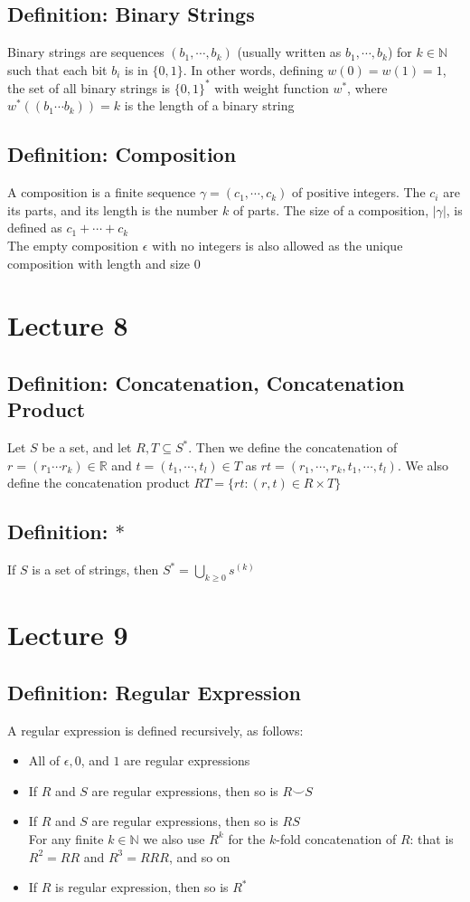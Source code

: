 \documentclass[11pt]{article}
\newcommand{\N}{{\mathbb{N}}}
\newcommand{\R}{{\mathbb{R}}}
\newcommand{\ds}{\displaystyle}
\begin{document}
\subsection{Definition: Binary Strings}
Binary strings are sequences $(b_1,\cdots,b_k)$ (usually written as $b_1,\cdots,b_k$) for $k\in\N$ such that each bit $b_i$ is in $\{0,1\}$.
In other words, defining $w(0) = w(1) = 1$, the set of all binary strings is $\{0,1\}^*$ with weight function $w^*$, where $w^*((b_1\cdots b_k)) = k$ is the length of a binary string
\subsection{Definition: Composition}
A composition is a finite sequence $\gamma=(c_1,\cdots,c_k)$ of positive integers. The $c_i$ are its parts, and its length is the number $k$ of parts. The size of a composition, $|\gamma|$, is defined as $c_1+\cdots+c_k$ \\
The empty composition $\epsilon$ with no integers is also allowed as the unique composition with length and size $0$

\section{Lecture 8}
\subsection{Definition: Concatenation, Concatenation Product}
Let $S$ be a set, and let $R,T\subseteq S^*$. Then we define the concatenation of $r=(r_1\cdots r_k)\in\R$ and $t=(t_1,\cdots,t_l)\in T$ as $rt=(r_1,\cdots,r_k,t_1,\cdots,t_l)$.
We also define the concatenation product $RT=\{rt:(r,t)\in R\times T\}$
\subsection{Definition: $*$}
If $S$ is a set of strings, then $S^*=\ds\bigcup_{k\geq0} s^{(k)}$

\section{Lecture 9}
\subsection{Definition: Regular Expression}
A regular expression is defined recursively, as follows:
\begin{itemize}
  \item All of $\epsilon, 0$, and $1$ are regular expressions
  \item If $R$ and $S$ are regular expressions, then so is $R\smallsmile S$
  \item If $R$ and $S$ are regular expressions, then so is $RS$ \\
  For any finite $k\in\N$ we also use $R^k$ for the $k$-fold concatenation of $R$: that is $R^2=RR$ and $R^3=RRR$, and so on 
  \item If $R$ is regular expression, then so is $R^*$
\end{itemize}
\end{document}
